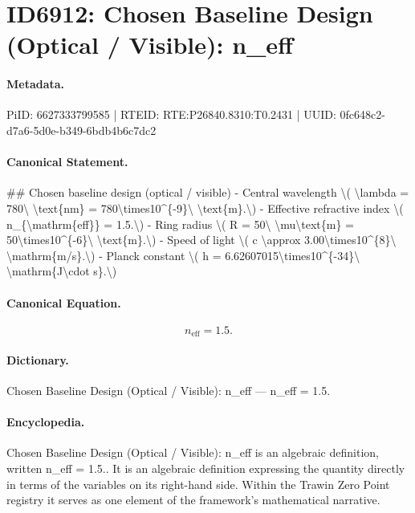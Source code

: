 \section*{ID6912: Chosen Baseline Design (Optical / Visible): n\_eff}
\paragraph{Metadata.}
PiID: 6627333799585 | RTEID: RTE:P26840.8310:T0.2431 | UUID: 0fc648c2-d7a6-5d0e-b349-6bdb4b6c7dc2

\paragraph{Canonical Statement.}
\#\# Chosen baseline design (optical / visible) - Central wavelength \textbackslash{}( \textbackslash{}lambda = 780\textbackslash{} \textbackslash{}text\{nm\} = 780\textbackslash{}times10\textasciicircum{}\{-9\}\textbackslash{} \textbackslash{}text\{m\}.\textbackslash{}) - Effective refractive index \textbackslash{}( n\_\{\textbackslash{}mathrm\{eff\}\} = 1.5.\textbackslash{}) - Ring radius \textbackslash{}( R = 50\textbackslash{} \textbackslash{}mu\textbackslash{}text\{m\} = 50\textbackslash{}times10\textasciicircum{}\{-6\}\textbackslash{} \textbackslash{}text\{m\}.\textbackslash{}) - Speed of light \textbackslash{}( c \textbackslash{}approx 3.00\textbackslash{}times10\textasciicircum{}\{8\}\textbackslash{} \textbackslash{}mathrm\{m/s\}.\textbackslash{}) - Planck constant \textbackslash{}( h = 6.62607015\textbackslash{}times10\textasciicircum{}\{-34\}\textbackslash{} \textbackslash{}mathrm\{J\textbackslash{}cdot s\}.\textbackslash{})

\paragraph{Canonical Equation.}
\[
n_{\mathrm{eff}} = 1.5.
\]

\paragraph{Dictionary.}
Chosen Baseline Design (Optical / Visible): n\_eff — n\_eff = 1.5.

\paragraph{Encyclopedia.}
Chosen Baseline Design (Optical / Visible): n\_eff is an algebraic definition, written n\_eff = 1.5.. It is an algebraic definition expressing the quantity directly in terms of the variables on its right-hand side. Within the Trawin Zero Point registry it serves as one element of the framework's mathematical narrative.
